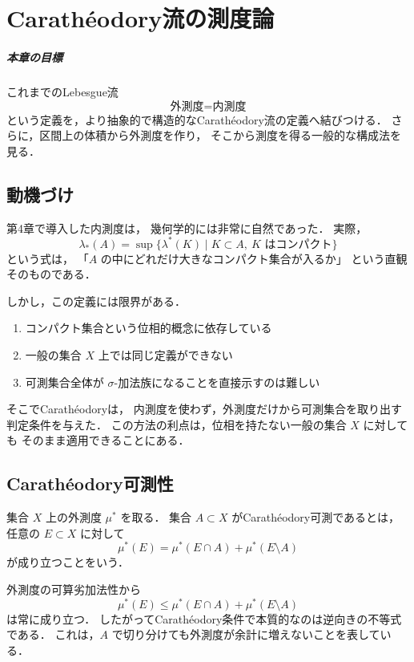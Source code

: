 \setcounter{chapter}{5}
\chapter{Carathéodory流の測度論}

\paragraph{本章の目標}
これまでのLebesgue流
\[
\text{外測度}=\text{内測度}
\]
という定義を，より抽象的で構造的なCarathéodory流の定義へ結びつける．
さらに，区間上の体積から外測度を作り，
そこから測度を得る一般的な構成法を見る．

\section{動機づけ}

第4章で導入した内測度は，
幾何学的には非常に自然であった．
実際，
\[
\lambda_*(A)
=
\sup\{\lambda^*(K)\mid K \subset A,\ K \text{ はコンパクト}\}
\]
という式は，
「$A$ の中にどれだけ大きなコンパクト集合が入るか」
という直観そのものである．

しかし，この定義には限界がある．
\begin{enumerate}
    \item コンパクト集合という位相的概念に依存している
    \item 一般の集合 $X$ 上では同じ定義ができない
    \item 可測集合全体が $\sigma$-加法族になることを直接示すのは難しい
\end{enumerate}

そこでCarathéodoryは，
内測度を使わず，外測度だけから可測集合を取り出す判定条件を与えた．
この方法の利点は，位相を持たない一般の集合 $X$ に対しても
そのまま適用できることにある．

\section{Carathéodory可測性}

\begin{definition}[Carathéodory可測]
集合 $X$ 上の外測度 $\mu^*$ を取る．
集合 $A \subset X$ がCarathéodory可測であるとは，
任意の $E \subset X$ に対して
\[
\mu^*(E)
=
\mu^*(E \cap A)+\mu^*(E \setminus A)
\]
が成り立つことをいう．
\end{definition}

\begin{remark}
外測度の可算劣加法性から
\[
\mu^*(E)
\le
\mu^*(E \cap A)+\mu^*(E \setminus A)
\]
は常に成り立つ．
したがってCarathéodory条件で本質的なのは逆向きの不等式である．
これは，$A$ で切り分けても外測度が余計に増えないことを表している．
\end{remark}

